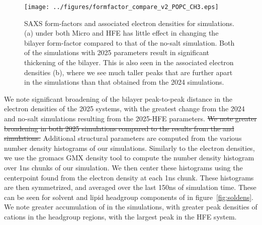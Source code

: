 \begin{figure}[H]
    \caption[Bilayer SAXS Form-factors and electron densities]{SAXS form-factors and associated electron densities for \mg{} simulations. (a)  under both Micro
and HFE has little effect in changing the bilayer form-factor compared to that of the no-salt simulation. Both of the simulations with 2025 parameters result in significant thickening of the bilayer.
This is also seen in the associated electron densities (b), where we see much taller peaks that are further apart in the  simulations
than that obtained from the 2024 simulations.}
    \label{fig:formfactors}
    \texttt{[image: ../figures/formfactor\_compare\_v2\_POPC\_CH3.eps]}
\end{figure}
We note significant broadening of the bilayer peak-to-peak distance in the electron densities of the 2025 systems, with the greatest change from the 2024 and no-salt simulations resulting from the 2025-HFE parameters. \st{We note greater broadening in both 2025 \mg{} simulations compared to the results from the \na{} and \li{} simulations.}
Additional structural parameters are computed from the various number density histograms of our simulations. Similarly to the electron densities, we use the gromacs GMX density tool to compute the number density histogram over 1ns chunks of our simulation. We then center these histograms using the centerpoint found from the electron
density at each 1ns chunk.
These histograms are then symmetrized, and averaged over the last 150ns of simulation time.
These can be seen for solvent and lipid headgroup components of in figure~\ref{fig:soldens}.
We note greater accumulation of \mg{} in the  simulations, with greater peak densities of cations in the headgroup regions, with the largest peak in the  HFE system.

